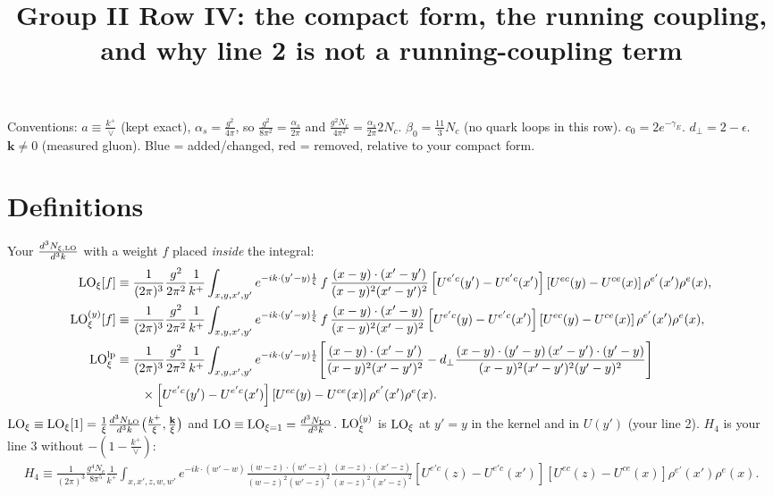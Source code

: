 \documentclass[10pt]{article}
\title{Group II Row IV: the compact form, the running coupling,\\ and why line 2 is not a running-coupling term}
\date{}
\numberwithin{equation}{section}
\newcommand{\new}[1]{{\color{blue}#1}}
\newcommand{\old}[1]{{\color{red}#1}}
\newcommand{\LO}{{\rm LO}}
\begin{document}
\maketitle
\noindent Conventions: $a\equiv\frac{k^+}{\vee}$ (kept exact), $\alpha_s=\frac{g^2}{4\pi}$, so $\frac{g^2}{8\pi^2}=\frac{\alpha_s}{2\pi}$ and $\frac{g^2N_c}{4\pi^2}=\frac{\alpha_s}{2\pi}2N_c$. $\beta_0=\frac{11}{3}N_c$ (no quark loops in this row). $c_0=2e^{-\gamma_E}$. $d_\perp=2-\epsilon$. $\mathbf k\neq0$ (measured gluon).
\new{Blue} = added/changed, \old{red} = removed, relative to your compact form.

\section{Definitions}
Your $\frac{d^3N_{\xi,\rm LO}}{d^3k}$ with a weight $f$ placed \emph{inside} the integral:
\begin{align}
\LO_\xi[f]&\equiv\frac{1}{(2\pi)^{3}}\frac{g^{2}}{2\pi^{2}}\frac{1}{k^{+}}\int_{x,y,x',y'}e^{-ik\cdot(y'-y)\frac1\xi}\,f\,\frac{(x-y)\cdot(x'-y')}{(x-y)^{2}(x'-y')^{2}}\left[U^{e'c}(y')-U^{e'c}(x')\right]\left[U^{ec}(y)-U^{ce}(x)\right]\rho^{e'}(x')\rho^{e}(x),\label{eq:LOxi}\\
\LO^{(y)}_\xi[f]&\equiv\frac{1}{(2\pi)^{3}}\frac{g^{2}}{2\pi^{2}}\frac{1}{k^{+}}\int_{x,y,x',y'}e^{-ik\cdot(y'-y)\frac1\xi}\,f\,\frac{(x-y)\cdot(x'-y)}{(x-y)^{2}(x'-y)^{2}}\left[U^{e'c}(y)-U^{e'c}(x')\right]\left[U^{ec}(y)-U^{ce}(x)\right]\rho^{e'}(x')\rho^{e}(x),\label{eq:LOy}\\
\LO^{\rm lp}_\xi&\equiv\frac{1}{(2\pi)^{3}}\frac{g^{2}}{2\pi^{2}}\frac{1}{k^{+}}\int_{x,y,x',y'}e^{-ik\cdot(y'-y)\frac1\xi}\Bigg[\frac{(x-y)\cdot(x'-y')}{(x-y)^{2}(x'-y')^{2}}-d_\perp\frac{(x-y)\cdot(y'-y)\,(x'-y')\cdot(y'-y)}{(x-y)^{2}(x'-y')^{2}(y'-y)^{2}}\Bigg]\notag\\
&\qquad\times\left[U^{e'c}(y')-U^{e'c}(x')\right]\left[U^{ec}(y)-U^{ce}(x)\right]\rho^{e'}(x')\rho^{e}(x).\label{eq:LOlp}
\end{align}
$\LO_\xi\equiv\LO_\xi[1]=\frac1\xi\frac{d^3N_{\rm LO}}{d^3k}\big(\frac{k^+}{\xi},\frac{\mathbf k}{\xi}\big)$ and $\LO\equiv\LO_{\xi=1}=\frac{d^3N_{\rm LO}}{d^3k}$. $\LO^{(y)}_\xi$ is $\LO_\xi$ at $y'=y$ in the kernel and in $U(y')$ (your line 2). $H_4$ is your line 3 without $-(1-\frac{k^+}{\vee})$:
\begin{align}
H_4\equiv\frac{1}{(2\pi)^{3}}\frac{g^{4}N_{c}}{8\pi^{5}}\frac{1}{k^{+}}\int_{x,x',z,w,w'}e^{-ik\cdot(w'-w)}\frac{(w-z)\cdot(w'-z)}{(w-z)^{2}(w'-z)^{2}}\frac{(x-z)\cdot(x'-z)}{(x-z)^{2}(x'-z)^{2}}\left[U^{e'c}(z)-U^{e'c}(x')\right]\left[U^{ec}(z)-U^{ce}(x)\right]\rho^{e'}(x')\rho^{e}(x).\label{eq:H4}
\end{align}
\end{document}
